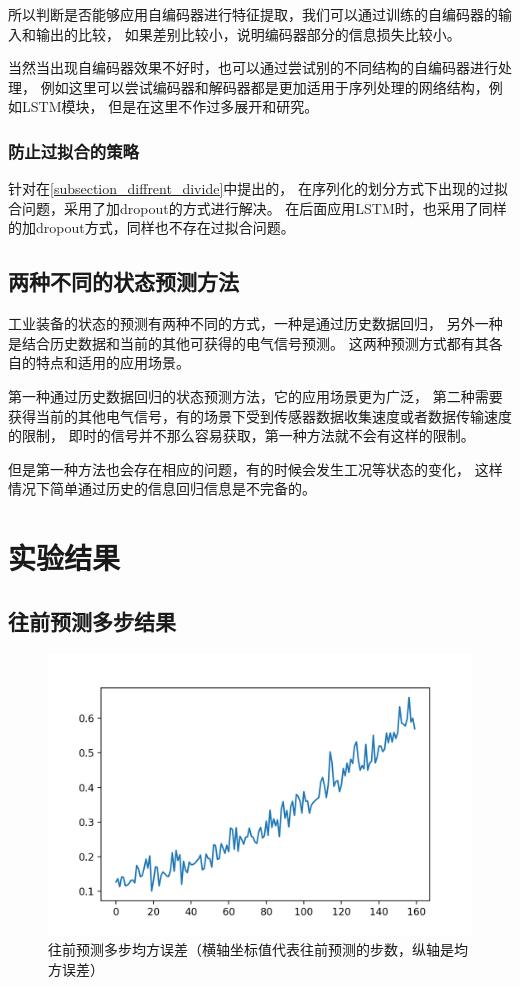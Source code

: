 所以判断是否能够应用自编码器进行特征提取，我们可以通过训练的自编码器的输入和输出的比较，
如果差别比较小，说明编码器部分的信息损失比较小。

当然当出现自编码器效果不好时，也可以通过尝试别的不同结构的自编码器进行处理，
例如这里可以尝试编码器和解码器都是更加适用于序列处理的网络结构，例如LSTM模块，
但是在这里不作过多展开和研究。
\subsubsection{防止过拟合的策略}
针对在\ref{subsection_diffrent_divide}中提出的，
在序列化的划分方式下出现的过拟合问题，采用了加dropout的方式进行解决。
在后面应用LSTM时，也采用了同样的加dropout方式，同样也不存在过拟合问题。

\subsection{两种不同的状态预测方法}
工业装备的状态的预测有两种不同的方式，一种是通过历史数据回归，
另外一种是结合历史数据和当前的其他可获得的电气信号预测。
这两种预测方式都有其各自的特点和适用的应用场景。

第一种通过历史数据回归的状态预测方法，它的应用场景更为广泛，
第二种需要获得当前的其他电气信号，有的场景下受到传感器数据收集速度或者数据传输速度的限制，
即时的信号并不那么容易获取，第一种方法就不会有这样的限制。

但是第一种方法也会存在相应的问题，有的时候会发生工况等状态的变化，
这样情况下简单通过历史的信息回归信息是不完备的。

\section{实验结果}

\subsection{往前预测多步结果}

  \begin{figure}
    \centering
    \includegraphics[width=0.8\linewidth]{figures/往前预测多步均方误差.png}
    \caption{往前预测多步均方误差（横轴坐标值代表往前预测的步数，纵轴是均方误差）}
    \label{fig:multi-step}
  \end{figure}

